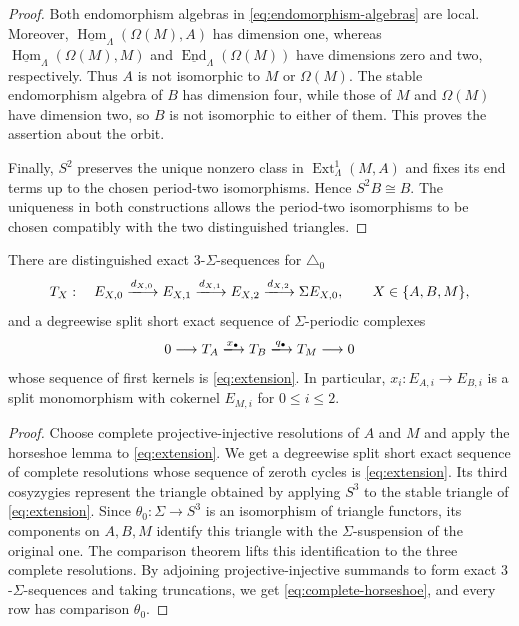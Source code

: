 \documentclass[a4paper,reqno,10pt]{amsart}
\numberwithin{equation}{section}
\DeclareMathOperator{\End}{End}
\DeclareMathOperator{\Hom}{Hom}
\newcommand{\Lam}{\Lambda}
\newcommand{\ol}[1]{\underline{#1}}
\begin{document}
\begin{proof}
Both endomorphism algebras in \eqref{eq:endomorphism-algebras} are local.
Moreover, $\ol{\Hom}_\Lam(\Omega(M),A)$ has dimension one, whereas
$\ol{\Hom}_\Lam(\Omega(M),M)$ and $\ol{\End}_\Lam(\Omega(M))$ have dimensions zero and two,
respectively. Thus $A$ is not isomorphic to $M$ or $\Omega(M)$. The stable
endomorphism algebra of $B$ has dimension four, while those of $M$ and $\Omega(M)$
have dimension two, so $B$ is not isomorphic to either of them. This proves
the assertion about the orbit.

Finally, $S^2$ preserves the unique nonzero class in
$\operatorname{Ext}^1_\Lam(M,A)$ and fixes its end terms up to the chosen
period-two isomorphisms. Hence $S^2B\cong B$. The uniqueness in both
constructions allows the period-two isomorphisms to be chosen compatibly
with the two distinguished triangles.
\end{proof}

\begin{lemma}\label{lem:complete-horseshoe}
There are distinguished exact $3$-$\Sigma$-sequences for $\triangle_0$
\[
 T_X:\quad
 E_{X,0}\xlongrightarrow{d_{X,0}}E_{X,1}
 \xlongrightarrow{d_{X,1}}E_{X,2}
 \xlongrightarrow{d_{X,2}}\Sigma E_{X,0},
 \qquad X\in\{A,B,M\},
\]
and a degreewise split short exact sequence of $\Sigma$-periodic complexes
\begin{equation}\label{eq:complete-horseshoe}
 0\longrightarrow T_A\xlongrightarrow{x_\bullet}T_B
 \xlongrightarrow{q_\bullet}T_M\longrightarrow0
\end{equation}
whose sequence of first kernels is \eqref{eq:extension}. In particular,
$x_i:E_{A,i}\longrightarrow E_{B,i}$ is a split monomorphism with cokernel
$E_{M,i}$ for $0\leq i\leq2$.
\end{lemma}

\begin{proof}
Choose complete projective-injective resolutions of $A$ and $M$ and apply
the horseshoe lemma to \eqref{eq:extension}. We get a degreewise split
short exact sequence of complete resolutions whose sequence of zeroth
cycles is \eqref{eq:extension}. Its third cosyzygies represent the triangle
obtained by applying $S^3$ to the stable triangle of
\eqref{eq:extension}. Since
$\theta_0:\Sigma\longrightarrow S^3$ is an isomorphism of triangle
functors, its components on $A,B,M$ identify this triangle with the
$\Sigma$-suspension of the original one. The comparison theorem lifts this
identification to the three complete resolutions. By adjoining
projective-injective summands to form exact $3$-$\Sigma$-sequences and taking truncations, we get
\eqref{eq:complete-horseshoe}, and every row has comparison
$\theta_0$.
\end{proof}
\end{document}
